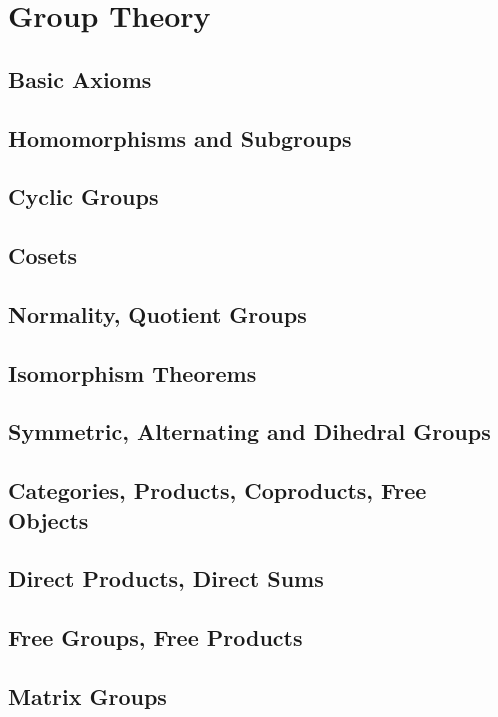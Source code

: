 \documentclass[a4paper,sfsidenotes,openany]{tufte-book}
\theoremstyle{definition}
\begin{document}
\chapter{Group Theory}
\begin{fullwidth}
\section{Basic Axioms}

\section{Homomorphisms and Subgroups}

\section{Cyclic Groups}

\section{Cosets}

\section{Normality, Quotient Groups}

\section{Isomorphism Theorems}

\section{Symmetric, Alternating and Dihedral Groups}

\section{Categories, Products, Coproducts, Free Objects}

\section{Direct Products, Direct Sums}

\section{Free Groups, Free Products}

\section{Matrix Groups}
	
\end{fullwidth}
\end{document}
